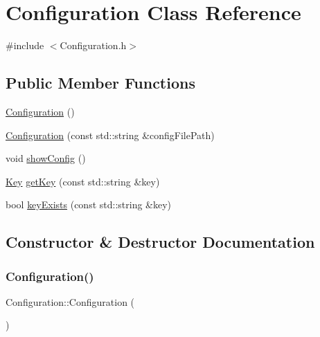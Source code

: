\hypertarget{class_configuration}{}\section{Configuration Class Reference}
\label{class_configuration}


{\ttfamily \#include $<$Configuration.\+h$>$}

\subsection*{Public Member Functions}
\begin{DoxyCompactItemize}
\item 
\hyperlink{class_configuration_a779947337bf652f0e773cb29f37f14ba}{Configuration} ()
\item 
\hyperlink{class_configuration_a30714cf8b087e25ae72f5acd49355885}{Configuration} (const std\+::string \&config\+File\+Path)
\item 
void \hyperlink{class_configuration_a73507806e263d80e7ef3c0ae33bb460f}{show\+Config} ()
\item 
\hyperlink{struct_key}{Key} \hyperlink{class_configuration_a8997893ed1c7d6e26bf426150e7476ac}{get\+Key} (const std\+::string \&key)
\item 
bool \hyperlink{class_configuration_a12fe6160c0d9e22d1349378e56141706}{key\+Exists} (const std\+::string \&key)
\end{DoxyCompactItemize}


\subsection{Constructor \& Destructor Documentation}
\mbox{\label{class_configuration_a779947337bf652f0e773cb29f37f14ba}} 
\subsubsection{\texorpdfstring{Configuration()}{Configuration()}\hspace{0.1cm}{\footnotesize\ttfamily [1/2]}}
{\footnotesize\ttfamily Configuration\+::\+Configuration (\begin{DoxyParamCaption}{ }\end{DoxyParamCaption})}

